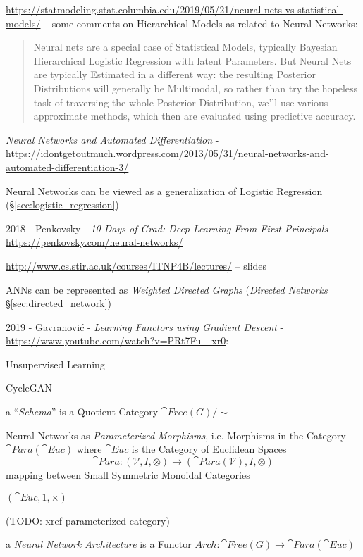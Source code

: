 \url{https://statmodeling.stat.columbia.edu/2019/05/21/neural-nets-vs-statistical-models/}
-- some comments on Hierarchical Models as related to Neural Networks:
\begin{quote}
  Neural nets are a special case of Statistical Models, typically Bayesian
  Hierarchical Logistic Regression with latent Parameters. But Neural Nets are
  typically Estimated in a different way: the resulting Posterior Distributions
  will generally be Multimodal, so rather than try the hopeless task of
  traversing the whole Posterior Distribution, we’ll use various approximate
  methods, which then are evaluated using predictive accuracy.
\end{quote}

\emph{Neural Networks and Automated Differentiation} -
\url{https://idontgetoutmuch.wordpress.com/2013/05/31/neural-networks-and-automated-differentiation-3/}

Neural Networks can be viewed as a generalization of Logistic Regression
(\S\ref{sec:logistic_regression})

2018 - Penkovsky - \emph{10 Days of Grad: Deep Learning From First Principals} -
\url{https://penkovsky.com/neural-networks/}

\asterism

\url{http://www.cs.stir.ac.uk/courses/ITNP4B/lectures/} -- slides

ANNs can be represented as \emph{Weighted Directed Graphs}
(\emph{Directed Networks} \S\ref{sec:directed_network})

\asterism

2019 - Gavranovi\'c - \emph{Learning Functors using Gradient Descent} -
\url{https://www.youtube.com/watch?v=PRt7Fu_-xr0}:

Unsupervised Learning

CycleGAN

a ``\emph{Schema}'' is a Quotient Category $\cat{Free}(G)/\sim$

Neural Networks as \emph{Parameterized Morphisms}, i.e. Morphisms in the
Category $\cat{Para}(\cat{Euc})$ where $\cat{Euc}$ is the Category of Euclidean
Spaces
\[
  \cat{Para} : (\mathcal{V}, I, \otimes)
    \to (\cat{Para}(\mathcal{V}), I, \otimes)
\]
mapping between Small Symmetric Monoidal Categories

$(\cat{Euc}, 1, \times)$

(TODO: xref parameterized category)

a \emph{Neural Network Architecture} is a Functor
$Arch : \cat{Free}(G) \to \cat{Para}(\cat{Euc})$


